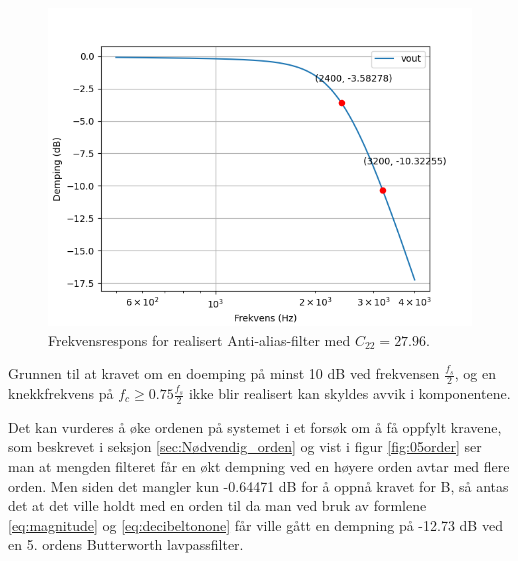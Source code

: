 \begin{figure}[!h]
	\centering
	\includegraphics[scale=0.45]{./Images/03Research/02frekvensrespons2.png}
	\caption{Frekvensrespons for realisert Anti-alias-filter med  $C_{22}=27.96$.}
	\label{fig:02frekvensresponsrealisert2}
\end{figure}

Grunnen til at kravet om en doemping på minst 10 dB ved frekvensen $\frac{f_s}{2}$, og en knekkfrekvens på $f_c\geq 0.75\frac{f_s}{2}$ ikke blir realisert kan skyldes avvik i komponentene.

Det kan vurderes å øke ordenen på systemet i et forsøk om å få oppfylt kravene, som beskrevet i seksjon \ref{sec:Nødvendig_orden} og vist i figur \ref{fig:05order} ser man at mengden filteret får en økt dempning ved en høyere orden avtar med flere orden. Men siden det mangler kun -0.64471 dB for å oppnå kravet for B, så antas det at det ville holdt med en orden til da man ved bruk av formlene \ref{eq:magnitude} og \ref{eq:decibeltonone} får ville gått en dempning på -12.73 dB ved en 5. ordens Butterworth lavpassfilter. 

